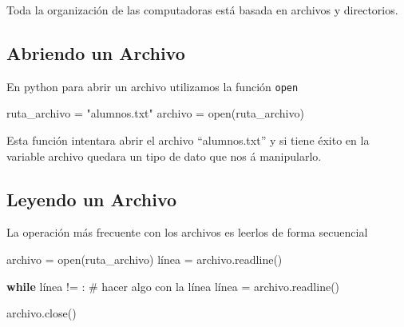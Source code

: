 \documentclass[
  letterpaper,
  DIV=11,
  numbers=noendperiod]{scrreprt}
\newenvironment{Shaded}{\begin{snugshade}}{\end{snugshade}}
\newcommand{\BuiltInTok}[1]{\textcolor[rgb]{0.00,0.23,0.31}{#1}}
\newcommand{\CommentTok}[1]{\textcolor[rgb]{0.37,0.37,0.37}{#1}}
\newcommand{\ControlFlowTok}[1]{\textcolor[rgb]{0.00,0.23,0.31}{\textbf{#1}}}
\newcommand{\NormalTok}[1]{\textcolor[rgb]{0.00,0.23,0.31}{#1}}
\newcommand{\OperatorTok}[1]{\textcolor[rgb]{0.37,0.37,0.37}{#1}}
\newcommand{\StringTok}[1]{\textcolor[rgb]{0.13,0.47,0.30}{#1}}
\begin{document}
\begin{tcolorbox}[enhanced jigsaw, opacitybacktitle=0.6, toptitle=1mm, toprule=.15mm, arc=.35mm, breakable, bottomrule=.15mm, opacityback=0, leftrule=.75mm, rightrule=.15mm, title=\textcolor{quarto-callout-note-color}{\faInfo}\hspace{0.5em}{Note}, left=2mm, bottomtitle=1mm, colframe=quarto-callout-note-color-frame, colback=white, titlerule=0mm, coltitle=black, colbacktitle=quarto-callout-note-color!10!white]

Toda la organización de las computadoras está basada en archivos y
directorios.

\end{tcolorbox}

\subsection{Abriendo un Archivo}\label{abriendo-un-archivo}

En python para abrir un archivo utilizamos la función \texttt{open}

\begin{Shaded}
\begin{Highlighting}[]
\NormalTok{ruta\_archivo }\OperatorTok{=} \StringTok{"alumnos.txt"}
\NormalTok{archivo }\OperatorTok{=} \BuiltInTok{open}\NormalTok{(ruta\_archivo)}
\end{Highlighting}
\end{Shaded}

Esta función intentara abrir el archivo ``alumnos.txt'' y si tiene éxito
en la variable archivo quedara un tipo de dato que nos á manipularlo.

\subsection{Leyendo un Archivo}\label{leyendo-un-archivo}

La operación más frecuente con los archivos es leerlos de forma
secuencial

\begin{Shaded}
\begin{Highlighting}[]
\NormalTok{archivo }\OperatorTok{=} \BuiltInTok{open}\NormalTok{(ruta\_archivo)}
\NormalTok{línea }\OperatorTok{=}\NormalTok{ archivo.readline()}

\ControlFlowTok{while}\NormalTok{ línea }\OperatorTok{!=} \StringTok{\textquotesingle{}\textquotesingle{}}\NormalTok{:}
  \CommentTok{\# hacer algo con la línea}
\NormalTok{  línea }\OperatorTok{=}\NormalTok{ archivo.readline()}

\NormalTok{archivo.close()}
\end{Highlighting}
\end{Shaded}
\end{document}
